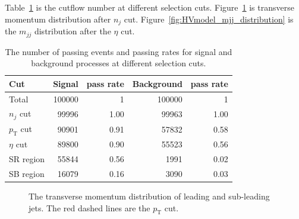 \documentclass[12pt]{article}
\begin{document}
        Table~\ref{tab:HVmodel_cutflow_number} is the cutflow number at different selection cuts. Figure~\ref{fig:HVmodel_pt_distribution} is transverse momentum distribution after $n_j$ cut. Figure~\ref{fig:HVmodel_mjj_distribution} is the $m_{jj}$ distribution after the $\eta$ cut.
        \begin{table}[htpb]
            \centering
            \caption{The number of passing events and passing rates for signal and background processes at different selection cuts.}
            \label{tab:HVmodel_cutflow_number}
            \begin{tabular}{l|rr|rr}
            Cut                & Signal & pass rate & Background & pass rate \\ \hline
            Total              & 100000  & 1         & 100000     & 1         \\
            $n_j$ cut          & 99996   & 1.00      & 99963      & 1.00      \\
            $p_{\text{T}}$ cut & 90901   & 0.91      & 57832      & 0.58      \\
            $\eta$ cut         & 89800   & 0.90      & 55523      & 0.56      \\ \hline
            SR region          & 55844   & 0.56      & 1991       & 0.02      \\
            SB region          & 16079   & 0.16      & 3090       & 0.03     
            \end{tabular}
        \end{table}

        \begin{figure}[htpb]
            \centering
            \caption{The transverse momentum distribution of leading and sub-leading jets. The red dashed lines are the $p_{\text{T}}$ cut.}
            \label{fig:HVmodel_pt_distribution}
        \end{figure}
\end{document}
